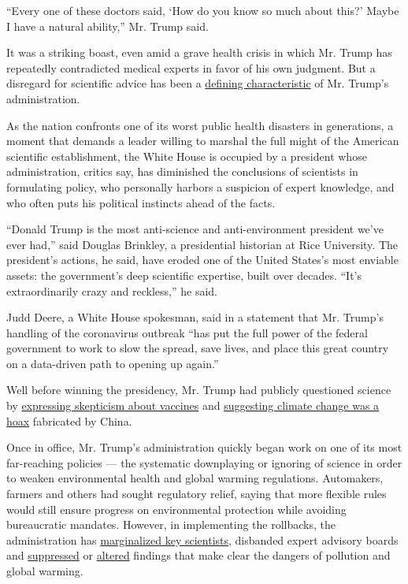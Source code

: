 ``Every one of these doctors said, `How do you know so much about this?'
Maybe I have a natural ability,'' Mr. Trump said.

It was a striking boast, even amid a grave health crisis in which Mr.
Trump has repeatedly contradicted medical experts in favor of his own
judgment. But a disregard for scientific advice has been a
\href{https://www.nytimes.com/2019/12/28/climate/trump-administration-war-on-science.html}{defining
characteristic} of Mr. Trump's administration.

As the nation confronts one of its worst public health disasters in
generations, a moment that demands a leader willing to marshal the full
might of the American scientific establishment, the White House is
occupied by a president whose administration, critics say, has
diminished the conclusions of scientists in formulating policy, who
personally harbors a suspicion of expert knowledge, and who often puts
his political instincts ahead of the facts.

``Donald Trump is the most anti-science and anti-environment president
we've ever had,'' said Douglas Brinkley, a presidential historian at
Rice University. The president's actions, he said, have eroded one of
the United States's most enviable assets: the government's deep
scientific expertise, built over decades. ``It's extraordinarily crazy
and reckless,'' he said.

Judd Deere, a White House spokesman, said in a statement that Mr.
Trump's handling of the coronavirus outbreak ``has put the full power of
the federal government to work to slow the spread, save lives, and place
this great country on a data-driven path to opening up again.''

Well before winning the presidency, Mr. Trump had publicly questioned
science by
\href{https://www.nytimes.com/2020/03/09/health/trump-vaccines.html}{expressing
skepticism about vaccines} and
\href{https://www.politifact.com/factchecks/2016/jun/03/hillary-clinton/yes-donald-trump-did-call-climate-change-chinese-h/}{suggesting
climate change was a hoax} fabricated by China.

Once in office, Mr. Trump's administration quickly began work on one of
its most far-reaching policies --- the systematic downplaying or
ignoring of science in order to weaken environmental health and global
warming regulations. Automakers, farmers and others had sought
regulatory relief, saying that more flexible rules would still ensure
progress on environmental protection while avoiding bureaucratic
mandates. However, in implementing the rollbacks, the administration has
\href{https://www.nytimes.com/2018/06/09/climate/trump-administration-science.html}{marginalized
key scientists}, disbanded expert advisory boards and
\href{https://www.nytimes.com/2019/06/08/climate/rod-schoonover-testimony.html}{suppressed}
or
\href{https://www.nytimes.com/2020/03/02/climate/goks-uncertainty-language-interior.html}{altered}
findings that make clear the dangers of pollution and global warming.

